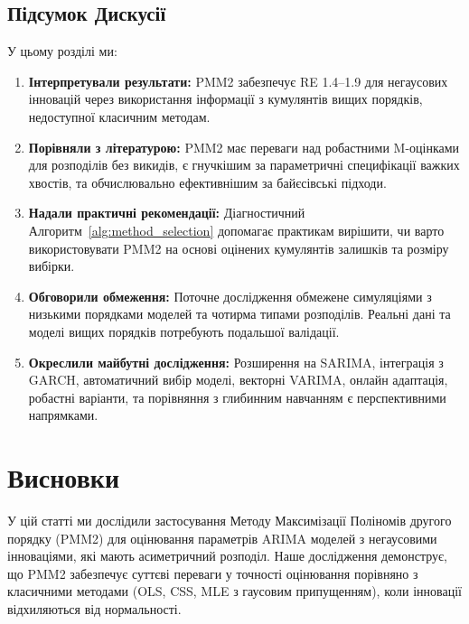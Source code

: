 \documentclass[12pt,a4paper]{article}
\begin{document}
\subsection{Підсумок Дискусії}
\label{subsec:discussion_summary}

У цьому розділі ми:

\begin{enumerate}
    \item \textbf{Інтерпретували результати:} PMM2 забезпечує RE 1.4--1.9 для негаусових інновацій через використання інформації з кумулянтів вищих порядків, недоступної класичним методам.

    \item \textbf{Порівняли з літературою:} PMM2 має переваги над робастними M-оцінками для розподілів без викидів, є гнучкішим за параметричні специфікації важких хвостів, та обчислювально ефективнішим за байєсівські підходи.

    \item \textbf{Надали практичні рекомендації:} Діагностичний Алгоритм~\ref{alg:method_selection} допомагає практикам вирішити, чи варто використовувати PMM2 на основі оцінених кумулянтів залишків та розміру вибірки.

    \item \textbf{Обговорили обмеження:} Поточне дослідження обмежене симуляціями з низькими порядками моделей та чотирма типами розподілів. Реальні дані та моделі вищих порядків потребують подальшої валідації.

    \item \textbf{Окреслили майбутні дослідження:} Розширення на SARIMA, інтеграція з GARCH, автоматичний вибір моделі, векторні VARIMA, онлайн адаптація, робастні варіанти, та порівняння з глибинним навчанням є перспективними напрямками.
\end{enumerate}


\section{Висновки}
\label{sec:conclusion}

У цій статті ми дослідили застосування Методу Максимізації Поліномів другого порядку (PMM2) для оцінювання параметрів ARIMA моделей з негаусовими інноваціями, які мають асиметричний розподіл. Наше дослідження демонструє, що PMM2 забезпечує суттєві переваги у точності оцінювання порівняно з класичними методами (OLS, CSS, MLE з гаусовим припущенням), коли інновації відхиляються від нормальності.
\end{document}
